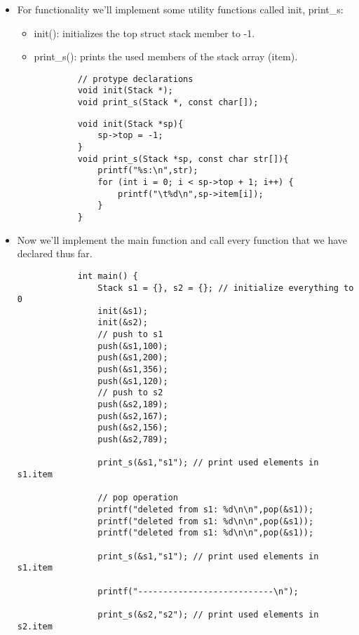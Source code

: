 \begin{itemize}
    \item For functionality we'll implement some utility functions called init, print\_s:
        \begin{itemize}
            \item init(): initializes the top struct stack member to -1.
            \item print\_s(): prints the used members of the stack array (item).
        \end{itemize}
        \begin{verbatim}
            // protype declarations
            void init(Stack *);
            void print_s(Stack *, const char[]);
        \end{verbatim}
        \begin{verbatim}
            void init(Stack *sp){
                sp->top = -1;
            }
            void print_s(Stack *sp, const char str[]){
                printf("%s:\n",str);
                for (int i = 0; i < sp->top + 1; i++) {
                    printf("\t%d\n",sp->item[i]);
                }
            }
        \end{verbatim}
    
    \item Now we'll implement the main function and call every function that we have declared thus far.
        \begin{verbatim}
            int main() {
                Stack s1 = {}, s2 = {}; // initialize everything to 0
                init(&s1);
                init(&s2);
                // push to s1
                push(&s1,100);
                push(&s1,200);
                push(&s1,356);
                push(&s1,120);
                // push to s2
                push(&s2,189);
                push(&s2,167);
                push(&s2,156);
                push(&s2,789);

                print_s(&s1,"s1"); // print used elements in s1.item

                // pop operation
                printf("deleted from s1: %d\n\n",pop(&s1));
                printf("deleted from s1: %d\n\n",pop(&s1));
                printf("deleted from s1: %d\n\n",pop(&s1));

                print_s(&s1,"s1"); // print used elements in s1.item

                printf("---------------------------\n");
                
                print_s(&s2,"s2"); // print used elements in s2.item


\end{verbatim}
\end{itemize}

